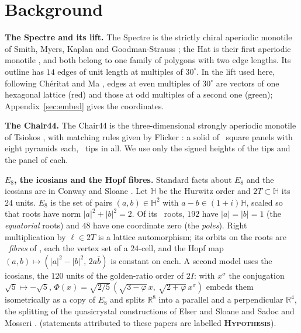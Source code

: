 \documentclass[11pt]{article}
\newcommand{\hypo}{\textbf{\textsc{Hypothesis}}}
\theoremstyle{definition}
\begin{document}
\appendix
\footnotesize

\section{Background}\label{sec:background}
\textbf{The Spectre and its lift.} The Spectre is the strictly chiral aperiodic monotile of Smith, Myers, Kaplan and Goodman-Strauss \cite{smith2023}; the Hat is their first aperiodic monotile \cite{smith2024hat}, and both belong to one family of polygons with two edge lengths. Its outline has $14$ edges of unit length at multiples of $30^\circ$. In the lift used here, following Ch\'eritat and Ma \cite{cheritat2023}, edges at even multiples of $30^\circ$ are vectors of one hexagonal lattice (red) and those at odd multiples of a second one (green); Appendix~\ref{sec:embed} gives the coordinates.

\textbf{The Chair44.} The Chair44 is the three-dimensional strongly aperiodic monotile of Tsiokos \cite{tsiokos2026}, with matching rules given by Flicker \cite{flicker2026}: a solid of \qgChairPanels\ square panels with eight pyramids each, \qgChairTips\ tips in all. We use only the signed heights of the tips and the panel of each.

\textbf{$E_8$, the icosians and the Hopf fibres.}\label{sec:bg-e8} Standard facts about $E_8$ and the icosians are in Conway and Sloane \cite{conwaysloane1999}. Let $\mathbb{H}$ be the Hurwitz order and $2T\subset\mathbb{H}$ its $24$ units. $E_8$ is the set of pairs $(a,b)\in\mathbb{H}^2$ with $a-b\in(1+i)\mathbb{H}$, scaled so that roots have norm $|a|^2+|b|^2=2$. Of its \qgRoots\ roots, $192$ have $|a|=|b|=1$ (the \emph{equatorial} roots) and $48$ have one coordinate zero (the \emph{poles}). Right multiplication by $\ell\in2T$ is a lattice automorphism; its orbits on the roots are \qgFibres\ \emph{fibres} of \qgFibreSize, each the vertex set of a $24$-cell, and the Hopf map $(a,b)\mapsto(|a|^2-|b|^2,\,2a\bar b)$ is constant on each. A second model uses the icosians, the $120$ units of the golden-ratio order of $2I$: with $x^\sigma$ the conjugation $\sqrt5\mapsto-\sqrt5$, $\Phi(x)=\sqrt{2/5}\,(\sqrt{3-\varphi}\,x,\ \sqrt{2+\varphi}\,x^\sigma)$ embeds them isometrically as a copy of $E_8$ and splits $\mathbb{R}^8$ into a parallel and a perpendicular $\mathbb{R}^4$, the splitting of the quasicrystal constructions of Elser and Sloane \cite{elsersloane1987} and Sadoc and Mosseri \cite{sadocmosseri1993}. (statements attributed to these papers are labelled \hypo ).
\end{document}
